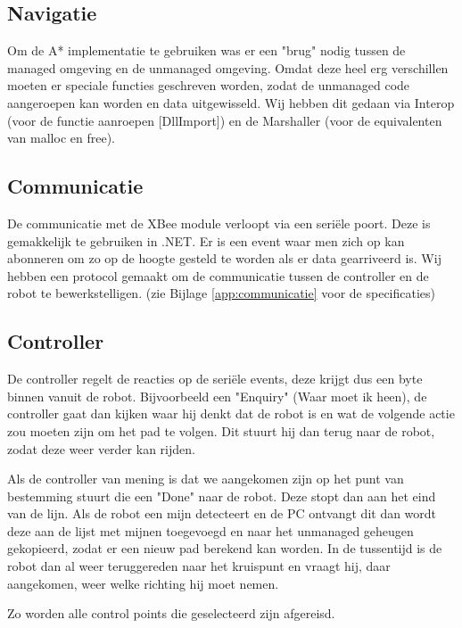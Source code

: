 \documentclass{report}
\begin{document}
\subsection{Navigatie}
Om de A* implementatie te gebruiken was er een "brug" nodig tussen de managed omgeving en de unmanaged omgeving.
Omdat deze heel erg verschillen moeten er speciale functies geschreven worden, zodat de unmanaged code aangeroepen kan worden en data uitgewisseld.
Wij hebben dit gedaan via Interop (voor de functie aanroepen [DllImport]) en de Marshaller (voor de equivalenten van malloc en free).
\subsection{Communicatie}
De communicatie met de XBee module verloopt via een seriële poort. Deze is gemakkelijk te gebruiken in .NET. Er is een event waar men zich op kan abonneren om zo op de hoogte gesteld te worden als er data gearriveerd is. Wij hebben een protocol gemaakt om de communicatie tussen de controller en de robot te bewerkstelligen. (zie Bijlage \ref{app:communicatie} voor de specificaties)

\subsection{Controller}
De controller regelt de reacties op de seriële events, deze krijgt dus een byte binnen vanuit de robot. Bijvoorbeeld een "Enquiry" (Waar moet ik heen), de controller gaat dan kijken waar hij denkt dat de robot is en wat de volgende actie zou moeten zijn om het pad te volgen.
Dit stuurt hij dan terug naar de robot, zodat deze weer verder kan rijden.

Als de controller van mening is dat we aangekomen zijn op het punt van bestemming stuurt die een "Done" naar de robot. Deze stopt dan aan het eind van de lijn.
Als de robot een mijn detecteert en de PC ontvangt dit dan wordt deze aan de lijst met mijnen toegevoegd en naar het unmanaged geheugen gekopieerd, zodat er een nieuw pad berekend kan worden.
In de tussentijd is de robot dan al weer teruggereden naar het kruispunt en vraagt hij, daar aangekomen, weer welke richting hij moet nemen.

Zo worden alle control points die geselecteerd zijn afgereisd.
\end{document}
